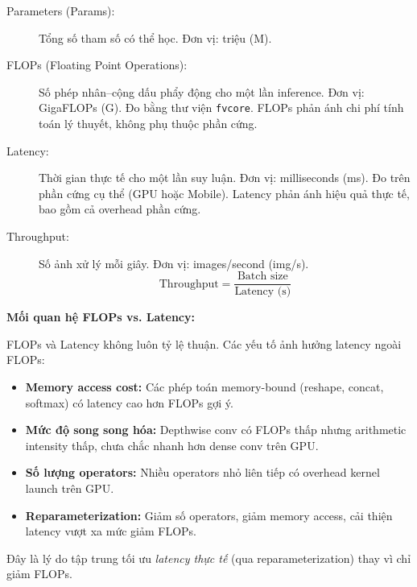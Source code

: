 \begin{description}
    \item[Parameters (Params):] Tổng số tham số có thể học. Đơn vị: triệu (M).
    
    \item[FLOPs (Floating Point Operations):] Số phép nhân--cộng dấu phẩy động cho một lần inference. Đơn vị: GigaFLOPs (G). Đo bằng thư viện \texttt{fvcore}. FLOPs phản ánh chi phí tính toán lý thuyết, không phụ thuộc phần cứng.
    
    \item[Latency:] Thời gian thực tế cho một lần suy luận. Đơn vị: milliseconds (ms). Đo trên phần cứng cụ thể (GPU hoặc Mobile). Latency phản ánh hiệu quả thực tế, bao gồm cả overhead phần cứng.
    
    \item[Throughput:] Số ảnh xử lý mỗi giây. Đơn vị: images/second (img/s).
    \begin{equation}
        \text{Throughput} = \frac{\text{Batch size}}{\text{Latency (s)}}
    \end{equation}
\end{description}

\textbf{Mối quan hệ FLOPs vs. Latency:}

FLOPs và Latency không luôn tỷ lệ thuận. Các yếu tố ảnh hưởng latency ngoài FLOPs:
\begin{itemize}
    \item \textbf{Memory access cost:} Các phép toán memory-bound (reshape, concat, softmax) có latency cao hơn FLOPs gợi ý.
    \item \textbf{Mức độ song song hóa:} Depthwise conv có FLOPs thấp nhưng arithmetic intensity thấp, chưa chắc nhanh hơn dense conv trên GPU.
    \item \textbf{Số lượng operators:} Nhiều operators nhỏ liên tiếp có overhead kernel launch trên GPU.
    \item \textbf{Reparameterization:} Giảm số operators, giảm memory access, cải thiện latency vượt xa mức giảm FLOPs.
\end{itemize}

Đây là lý do \fastvit{} tập trung tối ưu \textit{latency thực tế} (qua reparameterization) thay vì chỉ giảm FLOPs.
